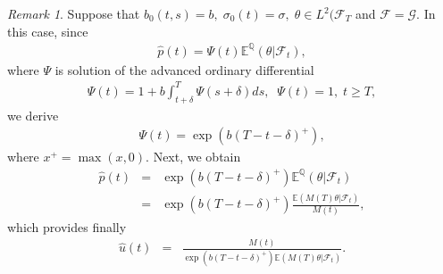 \documentclass[12pt]{article}
\theoremstyle{remark}
\newtheorem{remark}[theorem]{Remark}
\numberwithin{equation}{section}
\def\E{\mathbb E}
\def\Q{\mathbb Q}
\def\E{\mathbb E}
\begin{document}
\begin{remark}
Suppose that $b_{0}(t,s)=b,\; \sigma_0(t)=\sigma,\; \theta\in L^2(\mathcal{F}_T$ and $\mathcal{F}=\mathcal{G}$. In this case, since
\begin{eqnarray*}
\hat{p}(t)=\Psi(t)\E^{\Q}(\theta|\mathcal{F}_t),	
\end{eqnarray*}
where $\Psi$ is solution of the advanced ordinary differential
\begin{eqnarray*}
	\Psi(t)=1+b\int^T_{t+\delta}\Psi(s+\delta)ds,\;\; \Psi(t)=1, \; t\geq T,
\end{eqnarray*}
we derive
\begin{eqnarray*}
\Psi(t)=\exp(b(T-t-\delta)^{+}),
\end{eqnarray*}
where $x^{+}=\max(x,0)$.
Next, we obtain 
\begin{eqnarray*}
\hat{p}(t)&=&\exp(b(T-t-\delta)^{+})\E^{\Q}(\theta|\mathcal{F}_t)\\
&=& \exp(b(T-t-\delta)^{+})\frac{\E(M(T)\theta|\mathcal{F}_t)}{M(t)},
\end{eqnarray*}
which provides finally
\begin{eqnarray*}
\hat{u}(t)&=& \frac{M(t)}{\exp(b(T-t-\delta)^{+})\E(M(T)\theta|\mathcal{F}_t)}.
\end{eqnarray*}
\end{remark}
\end{document}
